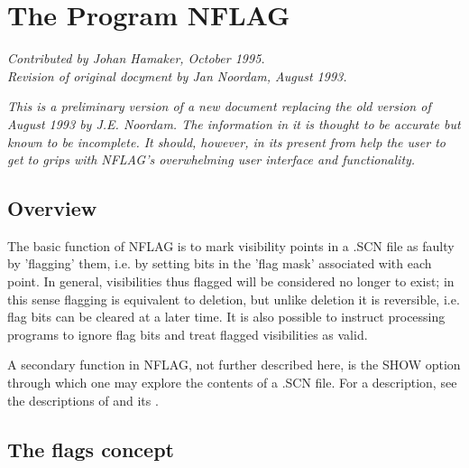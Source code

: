 %
%
\newcommand{\Em}[1]{{\em #1\/}}
\newcommand{\bi}{ \begin{itemize} }
\newcommand{\ei}{ \end{itemize} }


\chapter{The Program NFLAG}

\Em{\center
Contributed by Johan Hamaker, October 1995.\\
Revision of original docyment by Jan Noordam, August 1993.
}

\Em{
This is a preliminary version of a new document replacing the old version of
August 1993 by J.E. Noordam. The information in it is thought to be accurate
but known to be incomplete. It should, however, in its present from help the
user to get to grips with NFLAG's overwhelming user interface and functionality.
}

\tableofcontents

\section{Overview}
\label{.overview}

	The basic function of NFLAG is to mark visibility points in a .SCN file
as faulty by 'flagging' them, i.e. by setting bits in the 'flag mask'
associated with each point. In general, visibilities thus flagged will be
considered no longer to exist; in this sense flagging is equivalent to
deletion, but unlike deletion it is reversible, i.e. flag bits can be cleared
at a later time. It is also possible to instruct processing programs to ignore
flag bits and treat flagged visibilities as valid.

	A secondary function in NFLAG, not further described here, is the SHOW
option through which one may explore the contents of a .SCN file. For a
description, see the descriptions of  and its
.


\section{ The \NEWSTAR flags concept}
\label{.flag.concept}

